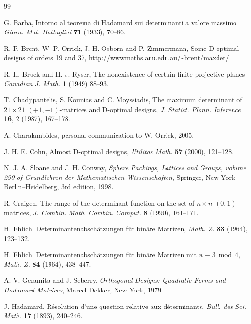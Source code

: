 \documentclass[11pt,a4paper]{article}
\begin{document}
\begin{thebibliography}{99}

G. Barba,
Intorno al teorema di Hadamard sui determinanti a valore massimo
\emph{Giorn. Mat. Battaglini} \textbf{71} (1933), 70--86.

R. P. Brent, W. P. Orrick, J. H. Osborn and P. Zimmermann, 
Some D-optimal designs of orders 19 and 37,
\url{http://wwwmaths.anu.edu.au/~brent/maxdet/}

R. H. Bruck and H. J. Ryser,
The nonexistence of certain finite projective planes
\emph{Canadian J. Math.} \textbf{1} (1949) 88--93. 

T. Chadjipantelis, S. Kounias and C. Moyssiadis,
The maximum determinant of $21 \times 21$ $(+1,-1)$-matrices and
D-optimal designs,
\emph{J. Statist. Plann. Inference} \textbf{16}, 2 (1987), 167--178.

A. Charalambides, %
personal communication to W. Orrick, 2005.   

J. H. E. Cohn,
Almost D-optimal designs,
\emph{Utilitas Math.} \textbf{57} (2000), 121--128.

N. J. A. Sloane and J. H. Conway, \emph{Sphere Packings, Lattices and Groups, volume 290 of Grundlehren der Mathematischen Wissenschaften}, Springer, New York--Berlin--Heidelberg, 3rd edition, 1998. 

R. Craigen,
The range of the determinant function on the set of $n \times n$
$(0,1)$-matrices, 
\emph{J. Combin. Math. Combin. Comput.} \textbf{8} (1990), 161--171.

H. Ehlich,	%
Determinantenabsch\"atzungen f\"ur bin\"are {M}atrizen,
\emph{Math. Z.} 	%
\textbf{83} (1964), 123--132.

H. Ehlich,	%
Determinantenabsch\"atzungen f\"ur bin\"are Matrizen 
mit $n \equiv 3 \bmod 4$,
\emph{Math. Z.} 	%
\textbf{84} (1964), 438--447.

A. V. Geramita and J. Seberry,
\emph{Orthogonal Designs: Quadratic Forms and Hadamard Matrices},
Marcel Dekker, New York, 1979.

J. Hadamard,
R\'esolution d'une question relative aux d\'eterminants,
\emph{Bull. des Sci. Math.} \textbf{17} (1893), 240--246.


\end{thebibliography}
\end{document}
